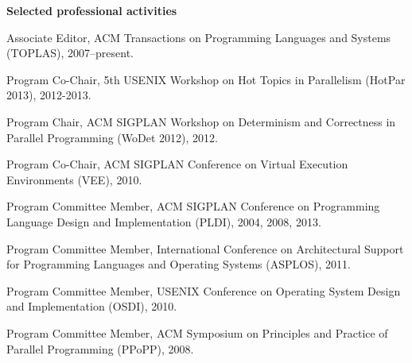 \documentclass[11pt]{article}
\begin{document}
\begin{description}


\end{description}


\begin{description}
\setlength{\labelsep}{0ex}
\setlength{\itemsep}{-0.5ex}

\item {\bf\textsf{Selected professional activities}}

\item Associate Editor, ACM Transactions on Programming Languages and Systems (TOPLAS), 2007--present.
\item Program Co-Chair, 5th USENIX Workshop on Hot Topics in Parallelism (HotPar 2013), 2012-2013.
\item Program Chair, ACM SIGPLAN Workshop on Determinism and Correctness in Parallel Programming (WoDet 2012), 2012.
\item Program Co-Chair, ACM SIGPLAN Conference on Virtual Execution Environments (VEE), 2010.
\item Program Committee Member, ACM SIGPLAN Conference on Programming Language Design and Implementation (PLDI), 2004, 2008, 2013.
\item Program Committee Member, International Conference on Architectural Support for Programming Languages and Operating Systems (ASPLOS), 2011.
\item Program Committee Member, USENIX Conference on Operating System Design and Implementation (OSDI), 2010.
\item Program Committee Member, ACM Symposium on Principles and Practice of Parallel Programming (PPoPP), 2008.

\end{description}
\end{document}

